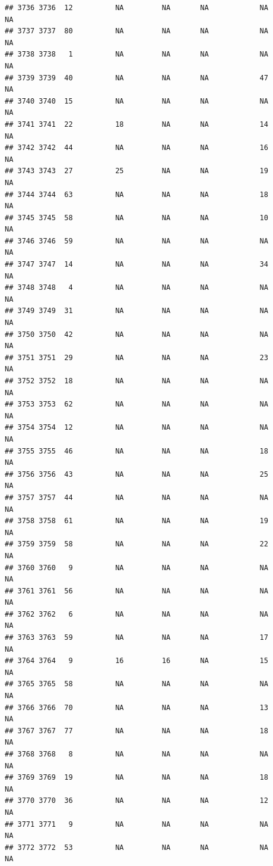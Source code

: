 \documentclass[man]{apa6}
\begin{document}
\begin{verbatim}
## 3736 3736  12          NA         NA       NA            NA       NA
## 3737 3737  80          NA         NA       NA            NA       NA
## 3738 3738   1          NA         NA       NA            NA       NA
## 3739 3739  40          NA         NA       NA            47       NA
## 3740 3740  15          NA         NA       NA            NA       NA
## 3741 3741  22          18         NA       NA            14       NA
## 3742 3742  44          NA         NA       NA            16       NA
## 3743 3743  27          25         NA       NA            19       NA
## 3744 3744  63          NA         NA       NA            18       NA
## 3745 3745  58          NA         NA       NA            10       NA
## 3746 3746  59          NA         NA       NA            NA       NA
## 3747 3747  14          NA         NA       NA            34       NA
## 3748 3748   4          NA         NA       NA            NA       NA
## 3749 3749  31          NA         NA       NA            NA       NA
## 3750 3750  42          NA         NA       NA            NA       NA
## 3751 3751  29          NA         NA       NA            23       NA
## 3752 3752  18          NA         NA       NA            NA       NA
## 3753 3753  62          NA         NA       NA            NA       NA
## 3754 3754  12          NA         NA       NA            NA       NA
## 3755 3755  46          NA         NA       NA            18       NA
## 3756 3756  43          NA         NA       NA            25       NA
## 3757 3757  44          NA         NA       NA            NA       NA
## 3758 3758  61          NA         NA       NA            19       NA
## 3759 3759  58          NA         NA       NA            22       NA
## 3760 3760   9          NA         NA       NA            NA       NA
## 3761 3761  56          NA         NA       NA            NA       NA
## 3762 3762   6          NA         NA       NA            NA       NA
## 3763 3763  59          NA         NA       NA            17       NA
## 3764 3764   9          16         16       NA            15       NA
## 3765 3765  58          NA         NA       NA            NA       NA
## 3766 3766  70          NA         NA       NA            13       NA
## 3767 3767  77          NA         NA       NA            18       NA
## 3768 3768   8          NA         NA       NA            NA       NA
## 3769 3769  19          NA         NA       NA            18       NA
## 3770 3770  36          NA         NA       NA            12       NA
## 3771 3771   9          NA         NA       NA            NA       NA
## 3772 3772  53          NA         NA       NA            NA       NA

\end{verbatim}
\end{document}
